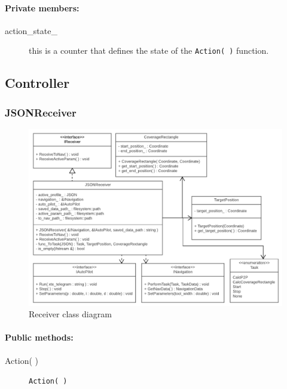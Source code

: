 \paragraph{Private members:}
\begin{adjustwidth}{2.5em}{0pt}\begin{description}
		\item [action_state_] this is a counter that defines the state of the \texttt{Action( )} function.
\end{description}\end{adjustwidth}



\subsection{Controller}

\subsubsection{JSONReceiver}

\begin{figure}[H]
\centering
\includegraphics[width=1\linewidth]{Images/Design/Receiver_class_diagram}
\caption{Receiver class diagram}
\label{fig:Receiver}
\end{figure}

\paragraph{Public methods:}
\begin{adjustwidth}{2.5em}{0pt}\begin{description}
		\item [Action( )] \texttt{Action( )}
\end{description}\end{adjustwidth}

